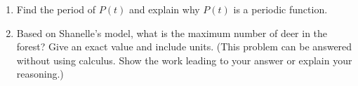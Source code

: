 \documentclass{article}
\begin{document}
\begin{enumerate}

\begin{enumerate}[topsep=0pt]
    \item Find the period of $P(t)$ and explain why $P(t)$ is a periodic function.
        \item Based on Shanelle's model, what is the maximum number of deer in the forest? Give an exact value and include units. (This problem can be answered without using calculus. Show the work leading to your answer or explain your reasoning.)

    \pspace{\newpage}


    
\end{enumerate}






\end{enumerate}
\end{document}

